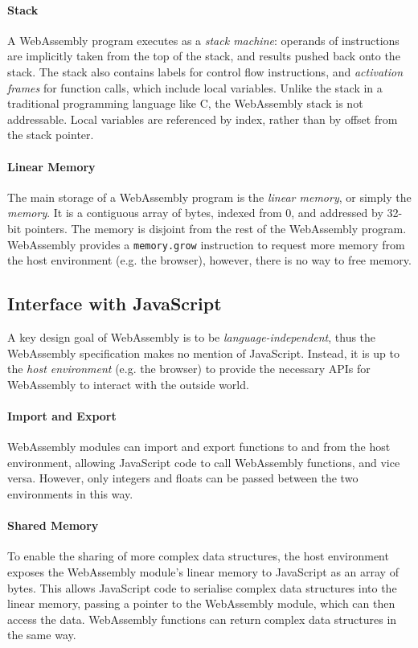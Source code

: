 \paragraph{Stack}

A WebAssembly program executes as a \emph{stack machine}: operands of instructions are implicitly taken from the top of the stack, and results pushed back onto the stack. The stack also contains labels for control flow instructions, and \emph{activation frames} for function calls, which include local variables. Unlike the stack in a traditional programming language like C, the WebAssembly stack is not addressable. Local variables are referenced by index, rather than by offset from the stack pointer.

\paragraph{Linear Memory}

The main storage of a WebAssembly program is the \emph{linear memory}, or simply the \emph{memory}. It is a contiguous array of bytes, indexed from 0, and addressed by 32-bit pointers. The memory is disjoint from the rest of the WebAssembly program. WebAssembly provides a \texttt{memory.grow} instruction to request more memory from the host environment (e.g. the browser), however, there is no way to free memory.

\subsection{Interface with JavaScript}

A key design goal of WebAssembly is to be \emph{language-independent}, thus the WebAssembly specification makes no mention of JavaScript. Instead, it is up to the \emph{host environment} (e.g. the browser) to provide the necessary APIs for WebAssembly to interact with the outside world.

\paragraph{Import and Export} WebAssembly modules can import and export functions to and from the host environment, allowing JavaScript code to call WebAssembly functions, and vice versa. However, only integers and floats can be passed between the two environments in this way.

\paragraph{Shared Memory} To enable the sharing of more complex data structures, the host environment exposes the WebAssembly module's linear memory to JavaScript as an array of bytes. This allows JavaScript code to serialise complex data structures into the linear memory, passing a pointer to the WebAssembly module, which can then access the data. WebAssembly functions can return complex data structures in the same way.

